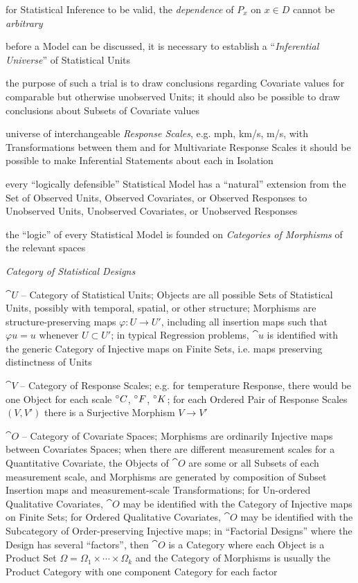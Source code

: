 for Statistical Inference to be valid, the \emph{dependence} of $P_x$ on
$x \in D$ cannot be \emph{arbitrary}

before a Model can be discussed, it is necessary to establish a
``\emph{Inferential Universe}'' of Statistical Units

the purpose of such a trial is to draw conclusions regarding Covariate values
for comparable but otherwise unobserved Units; it should also be possible to
draw conclusions about Subsets of Covariate values

universe of interchangeable \emph{Response Scales}, e.g. mph, km/s, m/s, with
Transformations between them and for Multivariate Response Scales it should be
possible to make Inferential Statements about each in Isolation

every ``logically defensible'' Statistical Model has a ``natural'' extension
from the Set of Observed Units, Observed Covariates, or Observed Responses to
Unobserved Units, Unobserved Covariates, or Unobserved Responses

the ``logic'' of every Statistical Model is founded on \emph{Categories of
  Morphisms} of the relevant spaces

\emph{Category of Statistical Designs}

$\cat{U}$ -- Category of Statistical Units; Objects are all possible Sets of
Statistical Units, possibly with temporal, spatial, or other structure;
Morphisms are structure-preserving maps $\varphi : U \to U'$, including all
insertion maps such that $\varphi u = u$ whenever $U \subset U'$; in typical
Regression problems, $\cat{u}$ is identified with the generic Category of
Injective maps on Finite Sets, i.e. maps preserving distinctness of Units

$\cat{V}$ -- Category of Response Scales; e.g. for temperature Response, there
would be one Object for each scale $^{\circ} C$, $^{\circ} F$, $^{\circ} K$; for
each Ordered Pair of Response Scales $(V, V')$ there is a Surjective Morphism
$V \to V'$

$\cat{O}$ -- Category of Covariate Spaces; Morphisms are ordinarily
Injective maps between Covariates Spaces; when there are different measurement
scales for a Quantitative Covariate, the Objects of $\cat{O}$ are some or
all Subsets of each measurement scale, and Morphisms are generated by
composition of Subset Insertion maps and measurement-scale Transformations; for
Un-ordered Qualitative Covariates, $\cat{O}$ may be identified with the
Category of Injective maps on Finite Sets; for Ordered Qualitative Covariates,
$\cat{O}$ may be identified with the Subcategory of Order-preserving
Injective maps; in ``Factorial Designs'' where the Design has several
``factors'', then $\cat{O}$ is a Category where each Object is a Product
Set $\Omega = \Omega_1 \times \cdots \times \Omega_k$ and the Category of
Morphisms is usually the Product Category with one component Category for each
factor

